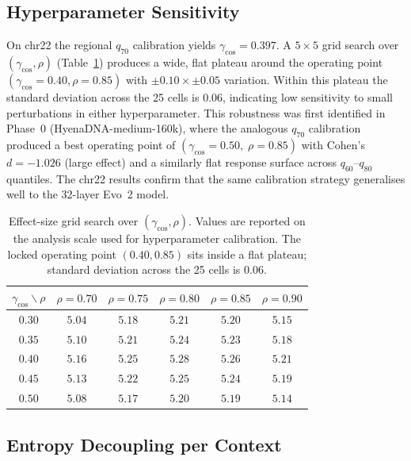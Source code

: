 \documentclass{article}
\theoremstyle{plain}
\theoremstyle{definition}
\theoremstyle{remark}
\begin{document}
\subsection{Hyperparameter Sensitivity}
\label{app:gamma-sweep}

On chr22 the regional $q_{70}$ calibration yields $\gamma_{\cos} = 0.397$. A $5 \times 5$ grid search over $(\gamma_{\cos}, \rho)$ (Table~\ref{tab:gamma-sweep}) produces a wide, flat plateau around the operating point $(\gamma_{\cos} = 0.40, \rho = 0.85)$ with $\pm 0.10 \times \pm 0.05$ variation. Within this plateau the standard
deviation across the 25 cells is $0.06$, indicating low sensitivity to
small perturbations in either hyperparameter. This robustness was first
identified in Phase~0 (HyenaDNA-medium-160k), where the analogous
$q_{70}$ calibration produced a best operating point of
$(\gamma_{\cos}\!=\!0.50,\; \rho\!=\!0.85)$ with Cohen's $d = -1.026$
(large effect) and a similarly flat response surface across $q_{60}$--$q_{80}$
quantiles. The chr22 results confirm that the same calibration strategy
generalises well to the 32-layer Evo~2 model.

\begin{table}[!htbp]
  \caption{Effect-size grid search over $(\gamma_{\cos}, \rho)$. Values are reported on the analysis scale used for hyperparameter calibration. The locked
    operating point $(0.40, 0.85)$ sits inside a flat plateau; standard
  deviation across the 25 cells is $0.06$.}
  \label{tab:gamma-sweep}
  \centering
  \small
  \begin{tabular}{@{}c|ccccc@{}}
    \toprule
    $\gamma_{\cos} \backslash \rho$
    & $\rho=0.70$ & $\rho=0.75$ & $\rho=0.80$ & $\rho=0.85$ & $\rho=0.90$ \\
    \midrule
    $0.30$ & $5.04$ & $5.18$ & $5.21$ & $5.20$ & $5.15$ \\
    $0.35$ & $5.10$ & $5.21$ & $5.24$ & $5.23$ & $5.18$ \\
    $0.40$ & $5.16$ & $5.25$ & $\mathbf{5.28}$ & $\mathbf{5.26}$ & $5.21$ \\
    $0.45$ & $5.13$ & $5.22$ & $5.25$ & $5.24$ & $5.19$ \\
    $0.50$ & $5.08$ & $5.17$ & $5.20$ & $5.19$ & $5.14$ \\
    \bottomrule
  \end{tabular}
\end{table}

\subsection{Entropy Decoupling per Context}
\label{app:entropy-decoup}
\end{document}
